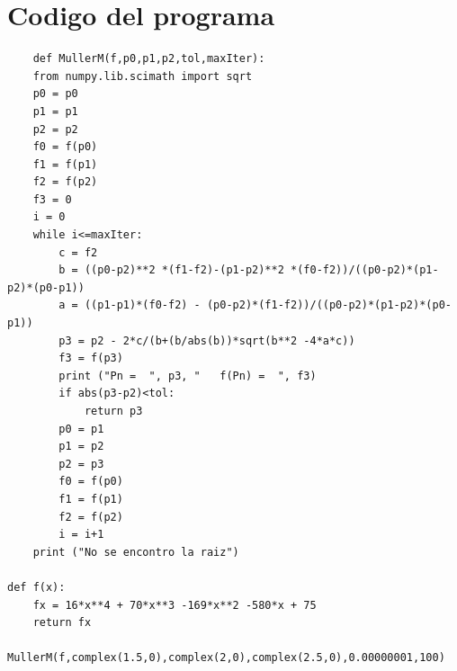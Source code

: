 \documentclass{article}
\begin{document}
\section{Codigo del programa}

\begin{lstlisting}
    def MullerM(f,p0,p1,p2,tol,maxIter):
    from numpy.lib.scimath import sqrt
    p0 = p0
    p1 = p1
    p2 = p2
    f0 = f(p0)
    f1 = f(p1)
    f2 = f(p2)
    f3 = 0
    i = 0
    while i<=maxIter:
        c = f2
        b = ((p0-p2)**2 *(f1-f2)-(p1-p2)**2 *(f0-f2))/((p0-p2)*(p1-p2)*(p0-p1))
        a = ((p1-p1)*(f0-f2) - (p0-p2)*(f1-f2))/((p0-p2)*(p1-p2)*(p0-p1))
        p3 = p2 - 2*c/(b+(b/abs(b))*sqrt(b**2 -4*a*c))
        f3 = f(p3)
        print ("Pn =  ", p3, "   f(Pn) =  ", f3)
        if abs(p3-p2)<tol:
            return p3
        p0 = p1
        p1 = p2
        p2 = p3
        f0 = f(p0)
        f1 = f(p1)
        f2 = f(p2)
        i = i+1
    print ("No se encontro la raiz")
    
def f(x):
    fx = 16*x**4 + 70*x**3 -169*x**2 -580*x + 75
    return fx

MullerM(f,complex(1.5,0),complex(2,0),complex(2.5,0),0.00000001,100)
\end{lstlisting}
\end{document}
